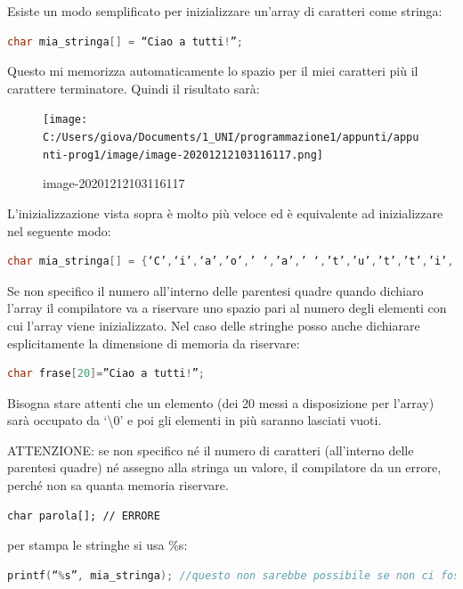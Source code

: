 \documentclass[
  paper=a4,
  oneside  ,captions=tableheading
]{scrbook}
\begin{document}
Esiste un modo semplificato per inizializzare un'array di caratteri come
stringa:

\begin{lstlisting}[language={C++}]
char mia_stringa[] = “Ciao a tutti!”;
\end{lstlisting}

Questo mi memorizza automaticamente lo spazio per il miei caratteri più
il carattere terminatore. Quindi il risultato sarà:

\begin{figure}
\centering
\texttt{[image: C:/Users/giova/Documents/1\_UNI/programmazione1/appunti/appunti-prog1/image/image-20201212103116117.png]}
\caption{image-20201212103116117}
\end{figure}

L'inizializzazione vista sopra è molto più veloce ed è equivalente ad
inizializzare nel seguente modo:

\begin{lstlisting}[language={C++}]
char mia_stringa[] = {‘C’,‘i’,‘a’,’o’,’ ‘,’a’,’ ‘,’t’,’u’,’t’,’t’,’i’,’!’,’\0’};
\end{lstlisting}

Se non specifico il numero all'interno delle parentesi quadre quando
dichiaro l'array il compilatore va a riservare uno spazio pari al numero
degli elementi con cui l'array viene inizializzato. Nel caso delle
stringhe posso anche dichiarare esplicitamente la dimensione di memoria
da riservare:

\begin{lstlisting}[language={C++}]
char frase[20]=”Ciao a tutti!”;
\end{lstlisting}

Bisogna stare attenti che un elemento (dei 20 messi a disposizione per
l'array) sarà occupato da `\textbackslash0' e poi gli elementi in più
saranno lasciati vuoti.

ATTENZIONE: se non specifico né il numero di caratteri (all'interno
delle parentesi quadre) né assegno alla stringa un valore, il
compilatore da un errore, perché non sa quanta memoria riservare.

\begin{lstlisting}
char parola[]; // ERRORE
\end{lstlisting}

per stampa le stringhe si usa \%s:

\begin{lstlisting}[language={C++}]
printf(“%s”, mia_stringa); //questo non sarebbe possibile se non ci fosse il carattere terminatore perché non saprei dove fermarmi 
\end{lstlisting}
\end{document}
